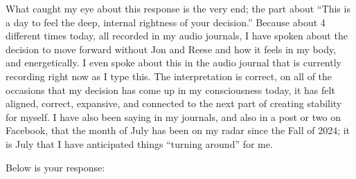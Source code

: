 \documentclass{article}
\begin{document}
What caught my eye about this response is the very end; the part about
``This is a day to feel the deep, internal rightness of your decision.''
Because about 4 different times today, all recorded in my audio
journals, I have spoken about the decision to move forward without Jon
and Reese and how it feels in my body, and energetically. I even spoke
about this in the audio journal that is currently recording right now as
I type this. The interpretation is correct, on all of the occasions that
my decision has come up in my consciousness today, it has felt aligned,
correct, expansive, and connected to the next part of creating stability
for myself. I have also been saying in my journals, and also in a post
or two on Facebook, that the month of July has been on my radar since
the Fall of 2024; it is July that I have anticipated things ``turning
around'' for me.

Below is your response:
\end{document}
